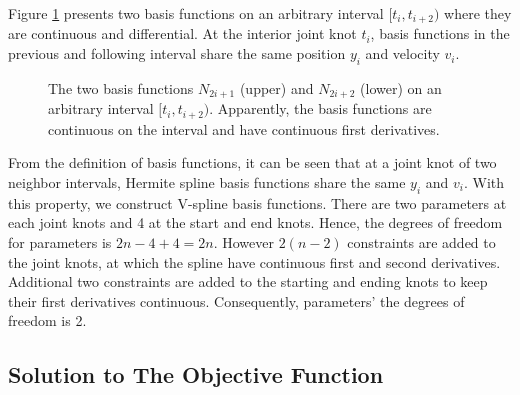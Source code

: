 Figure \ref{basisfigure} presents two basis functions on an arbitrary interval $[t_i, t_{i+2} )$ where they are continuous and differential. At the interior joint knot $t_i$, basis functions in the previous and following interval share the same position $y_i$ and velocity $v_i$. 
\begin{figure}[h] 
\centering
{}
\caption{The two basis functions $N_{2i+1}$ (upper) and $N_{2i+2}$ (lower) on an arbitrary interval $[t_i, t_{i+2})$. Apparently, the basis functions are continuous on the interval and have continuous first derivatives.}\label{basisfigure}
\end{figure}

From the definition of basis functions, it can be seen that at a joint knot of two neighbor intervals, Hermite spline basis functions share the same $y_i$ and $v_i$. With this property, we construct V-spline basis functions. There are two parameters at each joint knots and 4 at the start and end knots. Hence, the degrees of freedom for parameters is $2n-4+4=2n$. However $2(n-2)$ constraints are added to the joint knots, at which the spline have continuous first and second derivatives. Additional two constraints are added to the starting and ending knots to keep their first derivatives continuous. Consequently, parameters' the degrees of freedom is 2. 


\subsection{Solution to The Objective Function}

